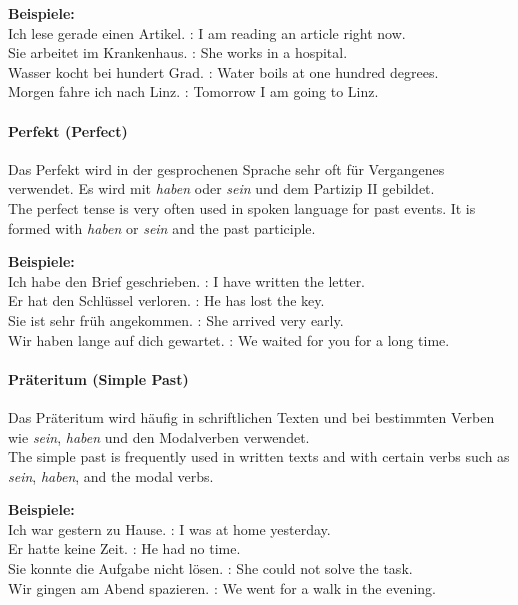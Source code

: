 \documentclass[a4paper]{article}
\begin{document}
            \textbf{Beispiele:}\\
            Ich lese gerade einen Artikel. : I am reading an article right now.\\
            Sie arbeitet im Krankenhaus. : She works in a hospital.\\
            Wasser kocht bei hundert Grad. : Water boils at one hundred degrees.\\
            Morgen fahre ich nach Linz. : Tomorrow I am going to Linz.
        
        \paragraph{Perfekt {\small (Perfect)}}
            Das Perfekt wird in der gesprochenen Sprache sehr oft für Vergangenes verwendet. Es wird mit \textit{haben} oder \textit{sein} und dem Partizip II gebildet.\\
            The perfect tense is very often used in spoken language for past events. It is formed with \textit{haben} or \textit{sein} and the past participle.
            
            \textbf{Beispiele:}\\
            Ich habe den Brief geschrieben. : I have written the letter.\\
            Er hat den Schlüssel verloren. : He has lost the key.\\
            Sie ist sehr früh angekommen. : She arrived very early.\\
            Wir haben lange auf dich gewartet. : We waited for you for a long time.
        
        \paragraph{Präteritum {\small (Simple Past)}}
            Das Präteritum wird häufig in schriftlichen Texten und bei bestimmten Verben wie \textit{sein}, \textit{haben} und den Modalverben verwendet.\\
            The simple past is frequently used in written texts and with certain verbs such as \textit{sein}, \textit{haben}, and the modal verbs.
            
            \textbf{Beispiele:}\\
            Ich war gestern zu Hause. : I was at home yesterday.\\
            Er hatte keine Zeit. : He had no time.\\
            Sie konnte die Aufgabe nicht lösen. : She could not solve the task.\\
            Wir gingen am Abend spazieren. : We went for a walk in the evening.
        
\end{document}
